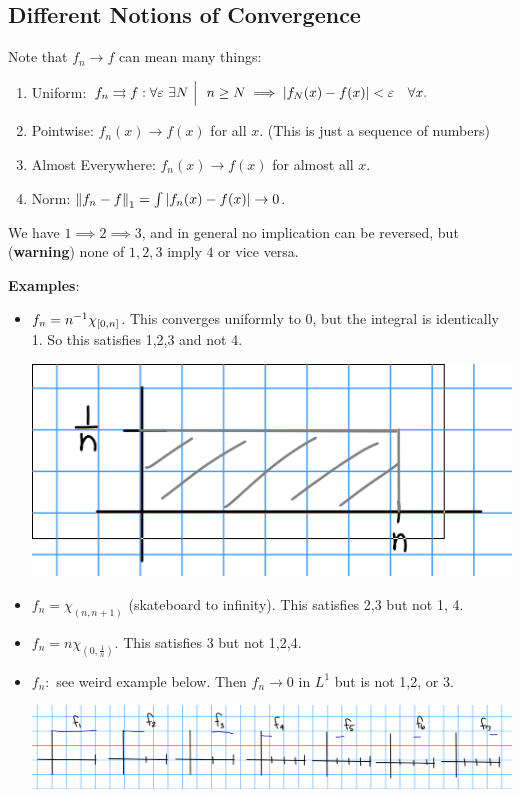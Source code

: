 \hypertarget{different-notions-of-convergence}{%
\subsection{Different Notions of
Convergence}\label{different-notions-of-convergence}}

Note that \(f_n \to f\) can mean many things:

\begin{enumerate}
\def\labelenumi{\arabic{enumi}.}
\tightlist
\item
  Uniform:
  \(f_n \rightrightarrows f: \forall \varepsilon ~\exists N {~\mathrel{\Big|}~} ~n\geq N \implies {\left\lvert {f_N(x) - f(x)} \right\rvert} < \varepsilon \quad \forall x.\)
\item
  Pointwise: \(f_n(x) \to f(x)\) for all \(x\). (This is just a sequence
  of numbers)
\item
  Almost Everywhere: \(f_n(x) \to f(x)\) for almost all \(x\).
\item
  Norm: \({\left\lVert {f_n - f} \right\rVert}_1 = \int {\left\lvert {f_n(x) - f(x)} \right\rvert} \to 0\).
\end{enumerate}

We have \(1 \implies 2 \implies 3\), and in general no implication can
be reversed, but (\textbf{warning}) none of \(1,2,3\) imply \(4\) or
vice versa.

\textbf{Examples}:

\begin{itemize}
\item
  \(f_n = n^{-1} \chi_{[0, n]}\). This converges uniformly to 0, but the
  integral is identically 1. So this satisfies 1,2,3 and not 4.

  \includegraphics{figures/2019-09-29-19:09.png}\\
\item
  \(f_n = \chi_{(n, n+1)}\) (skateboard to infinity). This satisfies 2,3
  but not 1, 4.
\item
  \(f_n = n\chi_{(0, \frac 1 n)}\). This satisfies 3 but not 1,2,4.
\item
  \(f_n:\) see weird example below. Then \(f_n \to 0\) in \(L^1\) but is
  not 1,2, or 3.

  \includegraphics{figures/2019-09-29-19:08.png}\\
\end{itemize}

